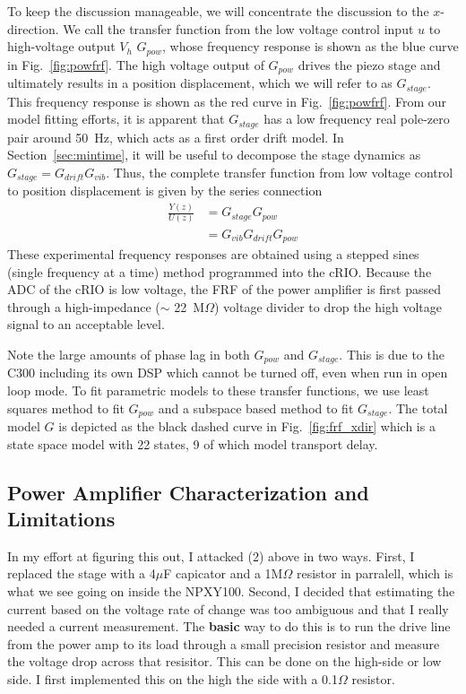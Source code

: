 \documentclass[journal,12pt,twocolumn,twoside]{IEEEtran/IEEEtran}
\begin{document}
To keep the discussion manageable, we will concentrate the discussion to the $x$-direction.
We call the transfer function from the low voltage control input $u$ to high-voltage output $V_{h}$ $G_{pow}$, whose frequency response is shown as the blue curve in Fig.~\ref{fig:powfrf}. The high voltage output of $G_{pow}$ drives the piezo stage and ultimately results in a position displacement, which we will refer to as $G_{stage}$. This frequency response is shown as the red curve in Fig.~\ref{fig:powfrf}. From our model fitting efforts, it is apparent that $G_{stage}$ has a low frequency real pole-zero pair around 50~Hz, which acts as a first order drift model. In Section~\ref{sec:mintime}, it will be useful to decompose the stage dynamics as $G_{stage} = G_{drift}G_{vib}$. 
Thus, the complete transfer function from low voltage control to position displacement is given by the series connection
\begin{align}
  \frac{Y(z)}{U(z)} &= G_{stage}G_{pow}\\
                    & =G_{vib}G_{drift}G_{pow}
\end{align}
These experimental frequency responses are obtained using a stepped sines (single frequency at a time) method programmed into the cRIO. Because the ADC of the cRIO is low voltage, the FRF of the power amplifier is first passed through a high-impedance ($\sim$ 22~M$\Omega$) voltage divider to drop the high voltage signal to an acceptable level. 

Note the large amounts of phase lag in both $G_{pow}$ and $G_{stage}$. This is due to the C300 including its own DSP which cannot be turned off, even when run in open loop mode. To fit parametric models to these transfer functions, we use least squares method to fit $G_{pow}$ and a subspace based method to fit $G_{stage}$. 
The total model $G$ is depicted as the black dashed curve in Fig.~\ref{fig:frf_xdir} which is a state space model with 22 states, 9 of which model transport delay.



\subsection{Power Amplifier Characterization and Limitations}
In my effort at figuring this out, I attacked (2) above in two ways. First, I replaced the stage with a 4\(\mu\)F capicator and a 1M\(\Omega\) resistor in parralell, which is what we see going on inside the NPXY100. Second, I decided that estimating the current based on the voltage rate of change was too ambiguous and that I really needed a current measurement. The \textbf{basic} way to do this is to run the drive line from the power amp to its load through a small precision resistor and measure the voltage drop across that resisitor. This can be done on the high-side or low side. I first implemented this on the high the side with a 0.1\(\Omega\) resistor. 
\end{document}
